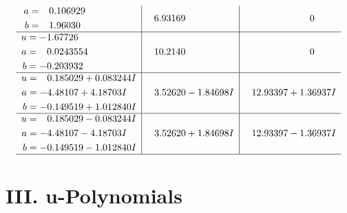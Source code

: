 \documentclass[1p]{elsarticle_modified}
\theoremstyle{definition}
\begin{document}
$$\begin{array}{c|c|c}
\begin{aligned}
a &= \phantom{-}0.106929\phantom{ +0.000000I} \\
b &= \phantom{-}1.96030\phantom{ +0.000000I}\end{aligned}
 & \phantom{-}6.93169\phantom{ +0.000000I} & \phantom{-0.000000 } 0 \\ \hline\begin{aligned}
u &= -1.67726\phantom{ +0.000000I} \\
a &= \phantom{-}0.0243554\phantom{ +0.000000I} \\
b &= -0.203932\phantom{ +0.000000I}\end{aligned}
 & \phantom{-}10.2140\phantom{ +0.000000I} & \phantom{-0.000000 } 0 \\ \hline\begin{aligned}
u &= \phantom{-}0.185029 + 0.083244 I \\
a &= -4.48107 + 4.18703 I \\
b &= -0.149519 + 1.012840 I\end{aligned}
 & \phantom{-}3.52620 - 1.84698 I & \phantom{-}12.93397 + 1.36937 I \\ \hline\begin{aligned}
u &= \phantom{-}0.185029 - 0.083244 I \\
a &= -4.48107 - 4.18703 I \\
b &= -0.149519 - 1.012840 I\end{aligned}
 & \phantom{-}3.52620 + 1.84698 I & \phantom{-}12.93397 - 1.36937 I\\
 \hline 
 \end{array}$$\newpage
\newpage\renewcommand{\arraystretch}{1}
\centering \section*{ III. u-Polynomials}
\end{document}
